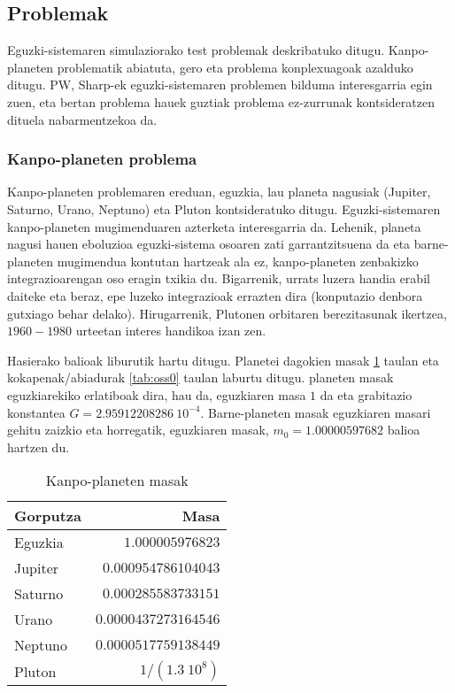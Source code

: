 \subsection{Problemak}
\label{ss:342}

Eguzki-sistemaren simulaziorako test problemak deskribatuko ditugu. Kanpo-planeten problematik abiatuta, gero eta problema konplexuagoak azalduko ditugu. PW, Sharp-ek \cite{Sharp2001} eguzki-sistemaren problemen bilduma interesgarria egin zuen, eta bertan problema hauek guztiak  problema ez-zurrunak kontsideratzen dituela nabarmentzekoa da.


\subsubsection*{Kanpo-planeten problema}


Kanpo-planeten problemaren ereduan, eguzkia, lau planeta nagusiak (Jupiter, Saturno, Urano, Neptuno) eta Pluton kontsideratuko ditugu. Eguzki-sistemaren kanpo-planeten  mugimenduaren azterketa interesgarria da. Lehenik, planeta nagusi hauen eboluzioa eguzki-sistema osoaren zati garrantzitsuena da eta barne-planeten mugimendua kontutan hartzeak ala ez, kanpo-planeten zenbakizko integrazioarengan oso eragin txikia du. Bigarrenik, urrats luzera handia erabil daiteke eta beraz, epe luzeko integrazioak errazten dira (konputazio denbora gutxiago behar delako). Hirugarrenik, Plutonen orbitaren berezitasunak ikertzea,  $1960-1980$ urteetan interes handikoa izan zen.        


Hasierako balioak \cite{Hairer2006} liburutik hartu ditugu. Planetei dagokien masak \ref{tab:ossm0} taulan eta kokapenak/abiadurak \ref{tab:oss0} taulan laburtu ditugu. planeten masak eguzkiarekiko erlatiboak dira, hau da, eguzkiaren masa $1$ da eta grabitazio konstantea $G=2.95912208286 \ 10^{-4}$. Barne-planeten masak eguzkiaren masari gehitu zaizkio eta horregatik, eguzkiaren masak, $m_0=1.00000597682$ balioa hartzen du.

\begin{table}[h]
\caption[Kanpo-planeten masak]{Kanpo-planeten masak}
\label{tab:ossm0}       %
\centering
\begin{tabular}{ l r }
\hline 
  Gorputza         &  Masa        
\\\hline
  Eguzkia          &  $1.000005976823$ \\
  Jupiter          &  $0.000954786104043$ \\
  Saturno          &  $0.000285583733151$ \\
  Urano            &  $0.0000437273164546$ \\
  Neptuno          &  $0.0000517759138449$ \\
  Pluton           &  ${1}/{(1.3 \ 10^8)}$ \\
\hline  
\end{tabular}
\end{table}


